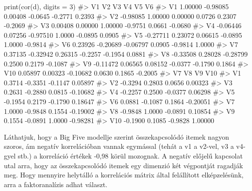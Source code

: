 \documentclass[
  letterpaper,
]{krantz}
\makeatletter
\newenvironment{Shaded}{\begin{snugshade}}{\end{snugshade}}
\newcommand{\AttributeTok}[1]{\textcolor[rgb]{0.40,0.45,0.13}{#1}}
\newcommand{\CommentTok}[1]{\textcolor[rgb]{0.37,0.37,0.37}{#1}}
\newcommand{\DecValTok}[1]{\textcolor[rgb]{0.68,0.00,0.00}{#1}}
\newcommand{\FunctionTok}[1]{\textcolor[rgb]{0.28,0.35,0.67}{#1}}
\newcommand{\NormalTok}[1]{\textcolor[rgb]{0.00,0.23,0.31}{#1}}
\newenvironment{kframe}{%
\medskip{}
\setlength{\fboxsep}{.8em}
 \def\at@end@of@kframe{}%
 \ifinner\ifhmode%
  \def\at@end@of@kframe{\end{minipage}}%
  \begin{minipage}{\columnwidth}%
 \fi\fi%
 \def\FrameCommand##1{\hskip\@totalleftmargin \hskip-\fboxsep
 \colorbox{shadecolor}{##1}\hskip-\fboxsep
     \hskip-\linewidth \hskip-\@totalleftmargin \hskip\columnwidth}%
 \MakeFramed {\advance\hsize-\width
   \@totalleftmargin\z@ \linewidth\hsize
   \@setminipage}}%
 {\par\unskip\endMakeFramed%
 \at@end@of@kframe}
\renewenvironment{Shaded}{\begin{kframe}}{\end{kframe}}
\makeatother
\begin{document}
\begin{Shaded}
\begin{Highlighting}[]
\FunctionTok{print}\NormalTok{(}\FunctionTok{cor}\NormalTok{(d), }\AttributeTok{digits =} \DecValTok{3}\NormalTok{)}
\CommentTok{\#\textgreater{}           V1       V2       V3      V4      V5      V6}
\CommentTok{\#\textgreater{} V1   1.00000 {-}0.98085  0.00408 {-}0.0645 {-}0.2771  0.2393}
\CommentTok{\#\textgreater{} V2  {-}0.98085  1.00000  0.00000  0.0726  0.2307 {-}0.2069}
\CommentTok{\#\textgreater{} V3   0.00408  0.00000  1.00000 {-}0.9751  0.0661 {-}0.0680}
\CommentTok{\#\textgreater{} V4  {-}0.06446  0.07256 {-}0.97510  1.0000 {-}0.0895  0.0905}
\CommentTok{\#\textgreater{} V5  {-}0.27711  0.23072  0.06615 {-}0.0895  1.0000 {-}0.9814}
\CommentTok{\#\textgreater{} V6   0.23926 {-}0.20689 {-}0.06797  0.0905 {-}0.9814  1.0000}
\CommentTok{\#\textgreater{} V7   0.37135 {-}0.32942  0.26315 {-}0.2257 {-}0.1954  0.0881}
\CommentTok{\#\textgreater{} V8  {-}0.33508  0.28028 {-}0.28799  0.2500  0.2179 {-}0.1087}
\CommentTok{\#\textgreater{} V9  {-}0.11472  0.06565  0.08152 {-}0.0377 {-}0.1790  0.1864}
\CommentTok{\#\textgreater{} V10  0.05897  0.00323 {-}0.10682  0.0630  0.1865 {-}0.2005}
\CommentTok{\#\textgreater{}          V7      V8      V9      V10}
\CommentTok{\#\textgreater{} V1   0.3714 {-}0.3351 {-}0.1147  0.05897}
\CommentTok{\#\textgreater{} V2  {-}0.3294  0.2803  0.0656  0.00323}
\CommentTok{\#\textgreater{} V3   0.2631 {-}0.2880  0.0815 {-}0.10682}
\CommentTok{\#\textgreater{} V4  {-}0.2257  0.2500 {-}0.0377  0.06298}
\CommentTok{\#\textgreater{} V5  {-}0.1954  0.2179 {-}0.1790  0.18647}
\CommentTok{\#\textgreater{} V6   0.0881 {-}0.1087  0.1864 {-}0.20051}
\CommentTok{\#\textgreater{} V7   1.0000 {-}0.9848  0.1554 {-}0.19002}
\CommentTok{\#\textgreater{} V8  {-}0.9848  1.0000 {-}0.0891  0.10854}
\CommentTok{\#\textgreater{} V9   0.1554 {-}0.0891  1.0000 {-}0.98281}
\CommentTok{\#\textgreater{} V10 {-}0.1900  0.1085 {-}0.9828  1.00000}
\end{Highlighting}
\end{Shaded}

Láthatjuk, hogy a Big Five modellje szerint összekapcsolódó itemek
nagyon szoros, ám negatív korrelációban vannak egymással (tehát a v1 a
v2-vel, v3 a v4-gyel stb.) a korreláció értékek -0,98 körül mozognak. A
negatív előjelű kapcsolat utal arra, hogy az összekapcsolódó itemek egy
dimenzió két végpontját ragadják meg. Hogy mennyire helytálló a
korrelációs mátrix által felállított elképzelésünk, arra a
faktoranalízis adhat választ.
\end{document}
